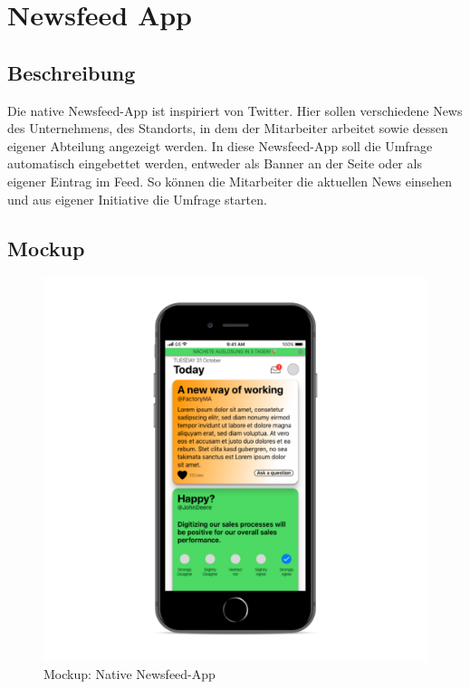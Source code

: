 \section{Newsfeed App}
\label{section:newsfeed_app}

\subsection{Beschreibung}

Die native Newsfeed-App ist inspiriert von Twitter. Hier sollen verschiedene News des Unternehmens, des Standorts, in dem der Mitarbeiter arbeitet sowie dessen eigener Abteilung angezeigt werden. In diese Newsfeed-App soll die Umfrage automatisch eingebettet werden, entweder als Banner an der Seite oder als eigener Eintrag im Feed. So können die Mitarbeiter die aktuellen News einsehen und aus eigener Initiative die Umfrage starten.

\subsection{Mockup}

\begin{figure}[H] 
\centering 
\includegraphics[scale=0.72]{images/5mockup} 
\caption[Mockup: Native Newsfeed-App]{Mockup: Native Newsfeed-App\protect} 
\label{ws} 
\end{figure}

